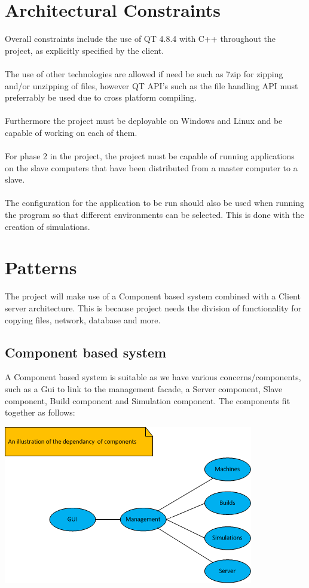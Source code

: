 \documentclass[a4paper,12pt,final]{article}
\begin{document}
\section{Architectural Constraints}
Overall constraints include the use of QT 4.8.4 with C++ throughout the project, as explicitly specified by the client.\\\textbf{\\}
The use of other technologies are allowed if need be such as 7zip for zipping and/or unzipping of files, however QT API's such as the file handling API must preferrably be used due to cross platform compiling.\\\textbf{\\}
Furthermore the project must be deployable on Windows and Linux and be capable of working on each of them.\\\textbf{\\}
For phase 2 in the project, the project must be capable of running applications on the slave computers that have been distributed from a master computer to a slave.\\\textbf{\\}
The configuration for the application to be run should also be used when running the program so that different environments can be selected. This is done with the creation of simulations.

\section{Patterns}
The project will make use of a Component based system combined with a Client server architecture. This is because project needs the division of functionality for copying files, network, database and more.
\subsection{Component based system}
A Component based system is suitable as we have various concerns/components, such as a Gui to link to the management facade, a Server component, Slave component, Build component and Simulation component. The components fit together as follows:
\begin{center}
  \includegraphics[scale=1]{ArchComponentDiag.png}
\end{center}
\end{document}
